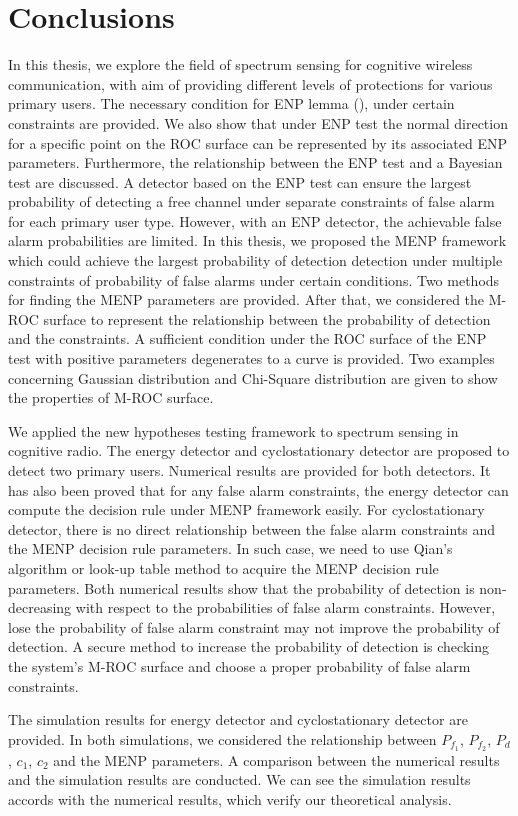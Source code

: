 \chapter{Conclusions}
In this thesis, we explore the field of spectrum sensing for cognitive wireless communication, with aim of providing different levels of protections for various primary users. The necessary condition for ENP lemma (), under certain constraints are provided. We also show that under ENP test the normal direction for a specific point on the ROC surface can be represented by its associated ENP parameters. Furthermore, the relationship between the ENP test and a Bayesian test are discussed. 
A detector based on the ENP test can ensure the largest probability of detecting a free channel under separate constraints of false alarm  for each primary user type. However, with an ENP detector, the achievable false alarm probabilities are limited.  
In this thesis, we proposed the MENP framework which could achieve the largest probability of detection detection under multiple constraints of probability of false alarms under certain conditions. Two methods for finding the MENP parameters are provided. 
After that, we considered the M-ROC surface to represent the relationship between the probability of detection and the constraints. A sufficient condition under the ROC surface of the ENP test with positive parameters degenerates to a curve is provided.  Two examples concerning Gaussian distribution and Chi-Square distribution are given to show the properties of M-ROC surface.

We applied the new hypotheses testing framework to spectrum sensing in cognitive radio. The energy detector and cyclostationary detector are proposed to detect two primary users. Numerical results are provided for both detectors. It has also been proved that for any false alarm constraints, the energy detector can compute the decision rule under MENP framework easily. For cyclostationary detector, there is no direct relationship between the false alarm constraints and the MENP decision rule parameters. In such case, we need to use Qian's algorithm or look-up table method to acquire the MENP decision rule parameters. Both numerical results show that the probability of detection is non-decreasing with respect to the probabilities of false alarm constraints. However, lose the probability of false alarm constraint may not improve the probability of detection. A secure method to increase the probability of detection is checking the system's M-ROC surface and choose a proper probability of false alarm constraints.  

The simulation results for energy detector and cyclostationary detector are provided. In both simulations, we considered the relationship between $P_{f_1}$, $P_{f_2}$, $P_d$, $c_1$, $c_2$ and the MENP parameters.  A comparison between the numerical results and the simulation results are conducted. We can see the simulation results accords with the numerical results, which verify our theoretical analysis. 

